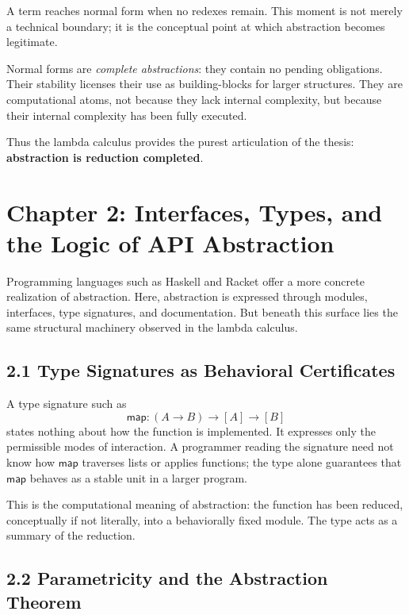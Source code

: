\documentclass[12pt,letterpaper]{article}
\theoremstyle{remark}
\begin{document}
A term reaches normal form when no redexes remain. This moment is not merely a technical boundary; it is the conceptual point at which abstraction becomes legitimate.

Normal forms are \emph{complete abstractions}: they contain no pending obligations. Their stability licenses their use as building-blocks for larger structures. They are computational atoms, not because they lack internal complexity, but because their internal complexity has been fully executed.

Thus the lambda calculus provides the purest articulation of the thesis: \textbf{abstraction is reduction completed}.

\newpage

\section{Chapter 2: Interfaces, Types, and the Logic of API Abstraction}

Programming languages such as Haskell and Racket offer a more concrete realization of abstraction. Here, abstraction is expressed through modules, interfaces, type signatures, and documentation. But beneath this surface lies the same structural machinery observed in the lambda calculus.

\subsection{2.1 Type Signatures as Behavioral Certificates}

A type signature such as
\[
\mathsf{map} : (A \to B) \to [A] \to [B]
\]
states nothing about how the function is implemented. It expresses only the permissible modes of interaction. A programmer reading the signature need not know how \(\mathsf{map}\) traverses lists or applies functions; the type alone guarantees that \(\mathsf{map}\) behaves as a stable unit in a larger program.

This is the computational meaning of abstraction: the function has been reduced, conceptually if not literally, into a behaviorally fixed module. The type acts as a summary of the reduction.

\subsection{2.2 Parametricity and the Abstraction Theorem}
\end{document}
